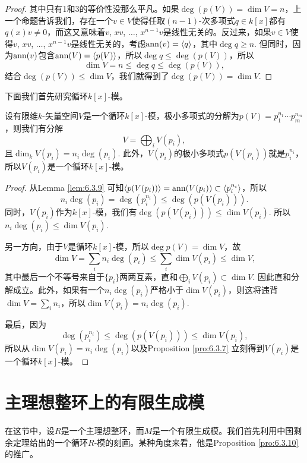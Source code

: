 \begin{proof}
    其中只有1和3的等价性没那么平凡。如果$\deg(p(V))=\dim V=n$，上一个命题告诉我们，存在一个$v\in V$使得任取$(n-1)$-次多项式$q\in k[x]$都有$q(x)v\neq 0$，而这又意味着$v$, $xv$, $\dots$, $x^{n-1}v$是线性无关的。反过来，如果$v\in V$使得$v$, $xv$, $\dots$, $x^{n-1}v$是线性无关的，考虑$\operatorname{ann}(v)=\langle q\rangle$，其中$\deg q\geq n$. 但同时，因为$\operatorname{ann}(v)$包含$\operatorname{ann}(V)=\langle p(V)\rangle$，所以$\deg q\leq \deg(p(V))$，所以
    \[
        \dim V=n\leq \deg q\leq \deg(p(V)),
    \]
    结合$\deg(p(V))\leq \dim V$，我们就得到了$\deg(p(V))=\dim V$.
\end{proof}

下面我们首先研究循环$k[x]$-模。

\begin{pro}\label{pro:6.3.10}
    设有限维$k$-矢量空间$V$是一个循环$k[x]$-模，极小多项式的分解为$p(V)=p_1^{n_1}\cdots p_m^{n_m}$，则我们有分解
    \[
       V=\bigoplus_i V(p_i),
    \]
    且$\dim_k V(p_i)=n_i\deg(p_i)$. 此外，$V(p_i)$的极小多项式$p(V(p_i))$就是$p_i^{n_i}$，所以$V(p_i)$是一个循环$k[x]$-模。
\end{pro}

\begin{proof}
    从Lemma \ref{lem:6.3.9} 可知$\langle p(V(p_i))\rangle=\operatorname{ann} (V(p_i))\subset \langle p_i^{n_i}\rangle$，所以
    \[n_i\deg(p_i)=\deg (p_i^{n_i})\leq \deg (p(V(p_i))).\]
    同时，$V(p_i)$作为$k[x]$-模，我们有$\deg (p(V(p_i))) \leq \dim V(p_i)$. 所以$n_i\deg(p_i)\leq \dim V(p_i)$. 
    
    另一方向，由于$V$是循环$k[x]$-模，所以$\deg p(V)=\dim V$，故
    \[
        \dim V=\sum_i n_i\deg(p_i)\leq \sum_i\dim V(p_i)\leq \dim V,
    \]
    其中最后一个不等号来自于$\{p_i\}$两两互素，直和$\bigoplus_i V(p_i)\subset \dim V$. 因此直和分解成立。此外，如果有一个$n_i\deg(p_i)$严格小于$\dim V(p_i)$，则这将违背$\dim V=\sum_i n_i$，所以$\dim V(p_i)=n_i\deg(p_i)$.

    最后，因为
    \[
        \deg(p_i^{n_i})\leq \deg (p(V(p_i)))\leq \dim V(p_i),
    \]
    所以从$\dim V(p_i)=n_i\deg(p_i)$以及Proposition \ref{pro:6.3.7} 立刻得到$V(p_i)$是一个循环$k[x]$-模。
\end{proof}

\section{主理想整环上的有限生成模}

在这节中，设$R$是一个主理想整环，而$M$是一个有限生成模。我们首先利用中国剩余定理给出的一个循环$R$-模的刻画。某种角度来看，他是Proposition \ref{pro:6.3.10} 的推广。

